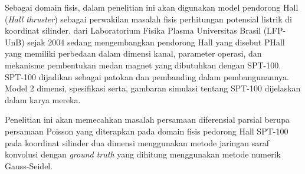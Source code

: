Sebagai domain fisis, dalam penelitian ini akan digunakan model pendorong Hall (\emph{Hall thruster}) sebagai perwakilan masalah fisis perhitungan potensial listrik di koordinat silinder. \cite{braga_miranda_2019} dari Laboratorium Fisika Plasma Universitas Brasil (LFP-UnB) sejak 2004 sedang mengembangkan pendorong Hall yang disebut PHall yang memiliki perbedaan dalam dimensi kanal, parameter operasi, dan mekanisme pembentukan medan magnet yang dibutuhkan dengan SPT-100. SPT-100 dijadikan sebagai patokan dan pembanding dalam pembangunannya. Model 2 dimensi, spesifikasi serta, gambaran simulasi tentang SPT-100 dijelaskan dalam karya mereka.

Penelitian ini akan memecahkan masalah persamaan diferensial parsial berupa persamaan Poisson yang diterapkan pada domain fisis pedorong Hall SPT-100 pada koordinat silinder dua dimensi menggunakan metode jaringan saraf konvolusi dengan \emph{ground truth} yang dihitung menggunakan metode numerik Gauss-Seidel.